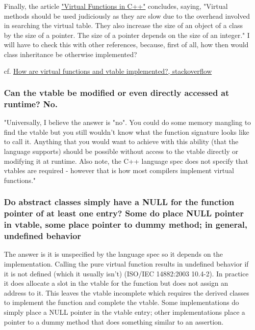 \documentclass[10pt]{amsart}
\begin{document}
\begin{multicols*}{2}
Finally, the article \href{http://wayback.archive.org/web/20100209040010/http://www.codersource.net/published/view/325/virtual_functions_in.aspx}{"Virtual Functions in C++"} concludes, saying, "Virtual methods should be used judiciously as they are slow due to the overhead involved in searching the virtual table. They also increase the size of an object of a class by the size of a pointer. The size of a pointer depends on the size of an integer."  I will have to check this with other references, because, first of all, how then would class inheritance be otherwise implemented?  

cf. \href{https://stackoverflow.com/questions/99297/how-are-virtual-functions-and-vtable-implemented}{How are virtual functions and vtable implemented?, stackoverflow}  

\subsubsection{Can the vtable be modified or even directly accessed at runtime?  No.}  

"Universally, I believe the answer is "no". You could do some memory mangling to find the vtable but you still wouldn't know what the function signature looks like to call it. Anything that you would want to achieve with this ability (that the language supports) should be possible without access to the vtable directly or modifying it at runtime. Also note, the C++ language spec does not specify that vtables are required - however that is how most compilers implement virtual functions."  

\subsubsection{Do abstract classes simply have a NULL for the function pointer of at least one entry?  Some do place NULL pointer in vtable, some place pointer to dummy method; in general, undefined behavior}

The answer is it is unspecified by the language spec so it depends on the implementation. Calling the pure virtual function results in undefined behavior if it is not defined (which it usually isn't) (ISO/IEC 14882:2003 10.4-2). In practice it does allocate a slot in the vtable for the function but does not assign an address to it. This leaves the vtable incomplete which requires the derived classes to implement the function and complete the vtable. Some implementations do simply place a NULL pointer in the vtable entry; other implementations place a pointer to a dummy method that does something similar to an assertion.


\end{multicols*}
\end{document}
